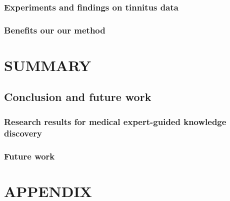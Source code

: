 \documentclass[
]{book}
\begin{document}
\hypertarget{experiments-and-findings-on-tinnitus-data}{%
\section{Experiments and findings on tinnitus data}\label{experiments-and-findings-on-tinnitus-data}}

\hypertarget{benefits-our-our-method-3}{%
\section{Benefits our our method}\label{benefits-our-our-method-3}}

\hypertarget{part-summary}{%
\part{SUMMARY}\label{part-summary}}

\hypertarget{summary}{%
\chapter{Conclusion and future work}\label{summary}}

\hypertarget{research-results-for-medical-expert-guided-knowledge-discovery}{%
\section{Research results for medical expert-guided knowledge discovery}\label{research-results-for-medical-expert-guided-knowledge-discovery}}

\hypertarget{future-work}{%
\section{Future work}\label{future-work}}

\hypertarget{part-appendix}{%
\part{APPENDIX}\label{part-appendix}}

\printbibliography
\end{document}

